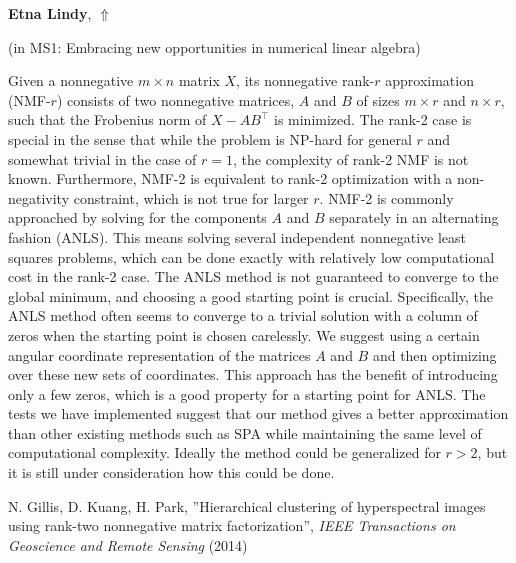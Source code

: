 \documentclass[ILAS2025-program.tex]{subfiles}
\begin{document}
     \hypertarget{down0271}{}\begin{ilasabstract}
    
    \textbf{Etna Lindy},  \hfill \hyperlink{up0271}{$\Uparrow$}
    
    (in {\color{mstitle}MS1: Embracing new opportunities in numerical linear algebra})
        
        \mtskip
    \begin{bibunit}
        Given a nonnegative $m \times n$ matrix $X$, its nonnegative rank-$r$ approximation (NMF-$r$) consists of two nonnegative matrices, $A $ and $B$ of sizes $m\times r$ and $n\times r$, such that the Frobenius norm of $X - AB^\top$ is minimized. The rank-2 case is special in the sense that while the problem is NP-hard for general $r$ and somewhat trivial in the case of $r=1$, the complexity of rank-2 NMF is not known. Furthermore, NMF-2 is equivalent to rank-2 optimization with a non-negativity constraint, which is not true for larger $r$.
NMF-2 is commonly approached by solving for the components $A$ and $B$ separately in an alternating fashion (ANLS). This means solving several independent nonnegative least squares problems, which can be done exactly with relatively low computational cost in the rank-2 case. The ANLS method is not guaranteed to converge to the global minimum, and choosing a good starting point is crucial. Specifically, the ANLS method often seems to converge to a trivial solution with a column of zeros when the starting point is chosen carelessly. 
We suggest using a certain angular coordinate representation of the matrices $A$ and $B$ and then optimizing over these new sets of coordinates.
This approach has the benefit of introducing only a few zeros, which is a good property for a starting point for ANLS.
The tests we have implemented suggest that our method gives a better approximation than other existing methods such as SPA \cite{gillis2014hierarchical} while maintaining the same level of computational complexity.
Ideally the method could be generalized for $r > 2$, but it is still under consideration how this could be done.

\begin{thebibliography}{9}
N. Gillis, D. Kuang, H. Park, ''Hierarchical clustering of hyperspectral images using rank-two nonnegative matrix factorization'', {\it IEEE Transactions on Geoscience and
Remote Sensing} (2014)
\end{thebibliography}
        \end{bibunit}
        \end{ilasabstract}
\end{document}
